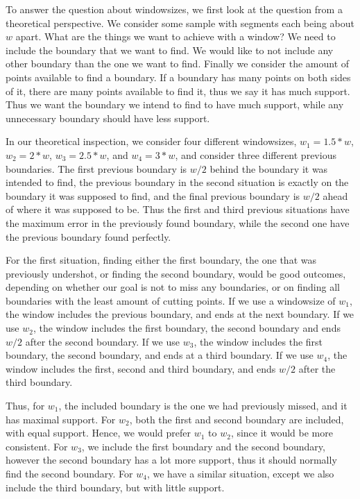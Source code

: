 To answer the question about windowsizes, we first look at the question from a theoretical perspective. We consider some sample with segments each being about $w$ apart. What are the things we want to achieve with a window? We need to include the boundary that we want to find. We would like to not include any other boundary than the one we want to find. Finally we consider the amount of points available to find a boundary. If a boundary has many points on both sides of it, there are many points available to find it, thus we say it has much support. Thus we want the boundary we intend to find to have much support, while any unnecessary boundary should have less support.

In our theoretical inspection, we consider four different windowsizes, $w_1=1.5*w$, $w_2=2*w$, $w_3=2.5*w$, and $w_4=3*w$, and consider three different previous boundaries. The first previous boundary is $w/2$ behind the boundary it was intended to find, the previous boundary in the second situation is exactly on the boundary it was supposed to find, and the final previous boundary is $w/2$ ahead of where it was supposed to be. Thus the first and third previous situations have the maximum error in the previously found boundary, while the second one have the previous boundary found perfectly.

For the first situation, finding either the first boundary, the one that was previously undershot, or finding the second boundary, would be good outcomes, depending on whether our goal is not to miss any boundaries, or on finding all boundaries with the least amount of cutting points. If we use a windowsize of $w_1$, the window includes the previous boundary, and ends at the next boundary. If we use $w_2$, the window includes the first boundary, the second boundary and ends $w/2$ after the second boundary. If we use $w_3$, the window includes the first boundary, the second boundary, and ends at a third boundary. If we use $w_4$, the window includes the first, second and third boundary, and ends $w/2$ after the third boundary.

 Thus, for $w_1$, the included boundary is the one we had previously missed, and it has maximal support. For $w_2$, both the first and second boundary are included, with equal support. Hence, we would prefer $w_1$ to $w_2$, since it would be more consistent. For $w_3$, we include the first boundary and the second boundary, however the second boundary has a lot more support, thus it should normally find the second boundary. For $w_4$, we have a similar situation, except we also include the third boundary, but with little support.

